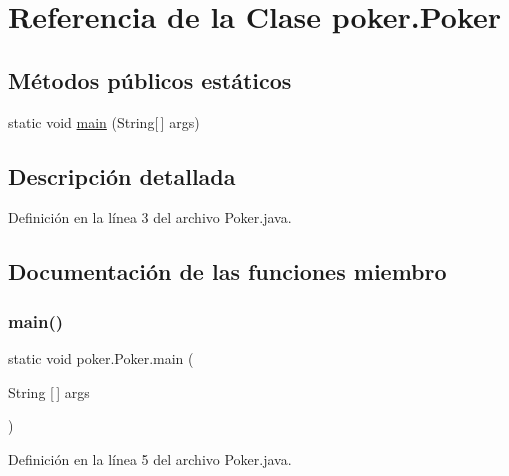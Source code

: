 \hypertarget{classpoker_1_1Poker}{}\section{Referencia de la Clase poker.\+Poker}
\label{classpoker_1_1Poker}
\subsection*{Métodos públicos estáticos}
\begin{DoxyCompactItemize}
\item 
static void \mbox{\hyperlink{classpoker_1_1Poker_ac07c479803c0f783042b79fb2999a9cb}{main}} (String\mbox{[}$\,$\mbox{]} args)
\end{DoxyCompactItemize}


\subsection{Descripción detallada}


Definición en la línea 3 del archivo Poker.\+java.



\subsection{Documentación de las funciones miembro}
\mbox{\label{classpoker_1_1Poker_ac07c479803c0f783042b79fb2999a9cb}} 
\subsubsection{\texorpdfstring{main()}{main()}}
{\footnotesize\ttfamily static void poker.\+Poker.\+main (\begin{DoxyParamCaption}\item[{String \mbox{[}$\,$\mbox{]}}]{args }\end{DoxyParamCaption})\hspace{0.3cm}{\ttfamily [static]}}



Definición en la línea 5 del archivo Poker.\+java.


